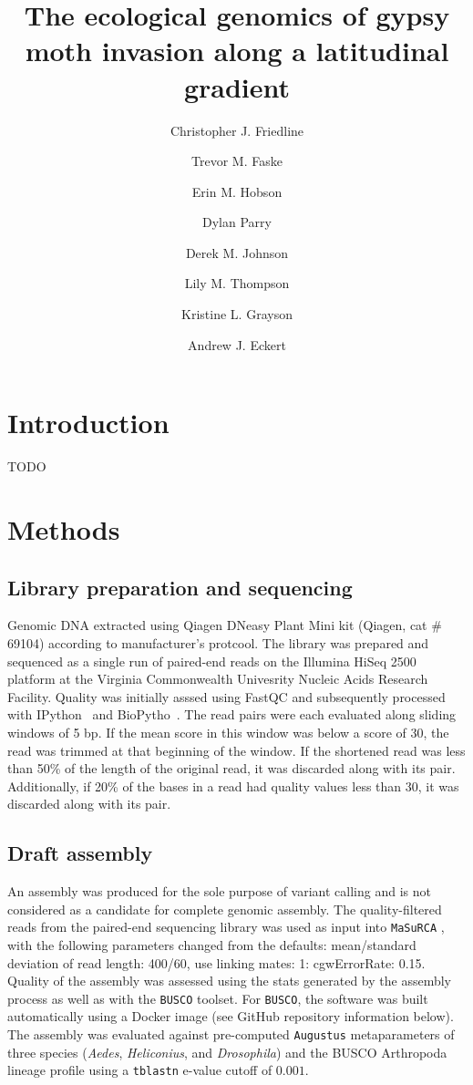 \documentclass[fleqn,11pt]{wlpeerj}
\title{The ecological genomics of gypsy moth invasion along a latitudinal
gradient}
\author[1]{Christopher J. Friedline}
\author[1]{Trevor M. Faske}
\author[1]{Erin M. Hobson}
\author[2]{Dylan Parry}
\author[1]{Derek M. Johnson}
\author[3]{Lily M. Thompson}
\author[3,*]{Kristine L. Grayson}
\author[1,*,\textdagger]{Andrew J. Eckert}
\affil[1]{Department of Biology, Virginia Commonwealth University}
\affil[2]{College of Environmental Science and Forestry, State University of
New York}
\affil[3]{Department of Biology, University of Richmond}
\affil[*]{Author contributed equally}
\affil[ \textdagger]{Corresponding author}
\begin{document}
\flushbottom
\maketitle
\thispagestyle{empty}

\linenumbers%

\section*{Introduction}
TODO


\section*{Methods}

\subsection*{Library preparation and sequencing}

Genomic DNA extracted using Qiagen DNeasy Plant Mini kit (Qiagen, cat \# 69104)
according to manufacturer's protcool.  The library was prepared and sequenced as
a single run of paired-end reads on the Illumina HiSeq 2500 platform at the
Virginia Commonwealth Univesrity Nucleic Acids Research Facility. Quality was
initially asssed using FastQC \citep{fastqc} and subsequently processed with
IPython~\citep{Perez:2007hy} and BioPytho~\citep{Cock:2009hj}. The read pairs
were each evaluated along sliding windows of 5 bp.  If the mean score in this
window was below a score of 30, the read was trimmed at that beginning of the
window. If the shortened read was less than 50\% of the length of the original
read, it was discarded along with its pair. Additionally, if 20\% of the bases
in a read had quality values less than 30, it was discarded along with its pair.

\subsection*{Draft assembly}

An assembly was produced for the sole purpose of variant calling and is not
considered as a candidate for complete genomic assembly. The quality-filtered
reads from the paired-end sequencing library was used as input into
\texttt{MaSuRCA} \citep[][version 2.3.2]{Zimin:2013kn}, with the following
parameters changed from the defaults: mean/standard deviation of read length:
400/60, use linking mates: 1: cgwErrorRate: 0.15.  Quality of the assembly was
assessed using the stats generated by the assembly process as well as with the
\texttt{BUSCO} \citep[][version 1.1b1]{Simao:2015kk} toolset. For
\texttt{BUSCO}, the software was built automatically using a Docker image (see
GitHub repository information below). The assembly was evaluated against
pre-computed \texttt{Augustus} \citep{Stanke:2003eo} metaparameters of  three
species (\textit{Aedes}, \textit{Heliconius}, and \textit{Drosophila}) and the
BUSCO Arthropoda lineage profile using a \texttt{tblastn} e-value cutoff of
$0.001$.
\end{document}
